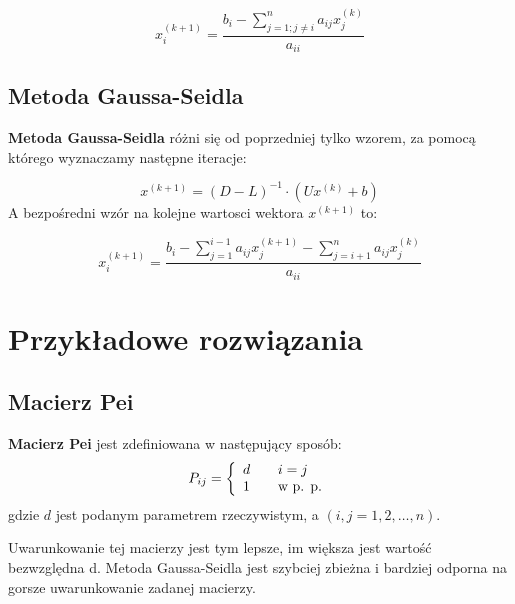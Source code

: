 \documentclass[a4paper,11pt]{article}
\begin{document}
  $$ x^{(k+1)}_i = \frac {b_i - \sum_{j=1; j \neq i }^n a_{ij} x^{(k)}_j} { a_{ii} } $$
  
\subsection{Metoda Gaussa-Seidla}
  \textbf{Metoda Gaussa-Seidla} różni się od poprzedniej tylko wzorem, za 
  pomocą którego wyznaczamy następne iteracje:
  
  $$ x^{(k+1)} = (D -L)^{-1} \cdot (Ux^{(k)} + b) $$
  A bezpośredni wzór na kolejne wartosci wektora $x^{(k+1)}$ to:
  
  $$ x^{(k+1)}_i = \frac {b_i - \sum_{j = 1}^{i-1} a_{ij} x^{(k+1)}_j - \sum_{j=i+1}^n a_{ij} x^{(k)}_j} { a_{ii} } $$

\section{Przykładowe rozwiązania}
\subsection{Macierz Pei}
  \textbf{Macierz Pei} jest zdefiniowana w następujący sposób:
    $$
        P_{ij} = \left\{\begin{array}{l l}
            d & \quad i = j \\
            1 & \quad \textrm{w p. p.}
        \end{array}\right.
    $$
    gdzie $d$ jest podanym parametrem rzeczywistym, a $ (i, j = 1, 2, \dots, n) $. 
    
    Uwarunkowanie tej macierzy jest tym lepsze, im większa jest wartość bezwzględna d. Metoda 
    Gaussa-Seidla jest szybciej zbieżna i bardziej odporna na gorsze uwarunkowanie zadanej macierzy.
\end{document}
